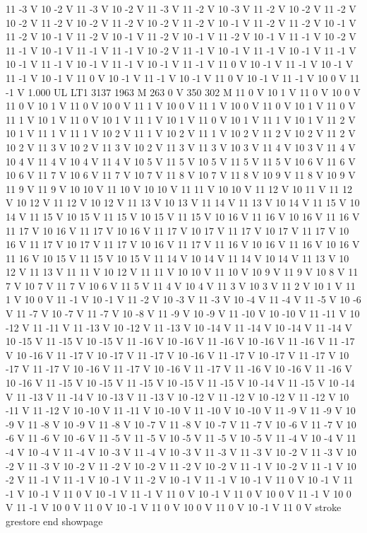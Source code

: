 {11 -3 V
10 -2 V
11 -3 V
10 -2 V
11 -3 V
11 -2 V
10 -3 V
11 -2 V
10 -2 V
11 -2 V
10 -2 V
11 -2 V
10 -2 V
11 -2 V
10 -2 V
11 -2 V
10 -1 V
11 -2 V
11 -2 V
10 -1 V
11 -2 V
10 -1 V
11 -2 V
10 -1 V
11 -2 V
10 -1 V
11 -2 V
10 -1 V
11 -1 V
10 -2 V
11 -1 V
10 -1 V
11 -1 V
11 -1 V
10 -2 V
11 -1 V
10 -1 V
11 -1 V
10 -1 V
11 -1 V
10 -1 V
11 -1 V
10 -1 V
11 -1 V
10 -1 V
11 -1 V
11 0 V
10 -1 V
11 -1 V
10 -1 V
11 -1 V
10 -1 V
11 0 V
10 -1 V
11 -1 V
10 -1 V
11 0 V
10 -1 V
11 -1 V
10 0 V
11 -1 V
1.000 UL
LT1
3137 1963 M
263 0 V
350 302 M
11 0 V
10 1 V
11 0 V
10 0 V
11 0 V
10 1 V
11 0 V
10 0 V
11 1 V
10 0 V
11 1 V
10 0 V
11 0 V
10 1 V
11 0 V
11 1 V
10 1 V
11 0 V
10 1 V
11 1 V
10 1 V
11 0 V
10 1 V
11 1 V
10 1 V
11 2 V
10 1 V
11 1 V
11 1 V
10 2 V
11 1 V
10 2 V
11 1 V
10 2 V
11 2 V
10 2 V
11 2 V
10 2 V
11 3 V
10 2 V
11 3 V
10 2 V
11 3 V
11 3 V
10 3 V
11 4 V
10 3 V
11 4 V
10 4 V
11 4 V
10 4 V
11 4 V
10 5 V
11 5 V
10 5 V
11 5 V
11 5 V
10 6 V
11 6 V
10 6 V
11 7 V
10 6 V
11 7 V
10 7 V
11 8 V
10 7 V
11 8 V
10 9 V
11 8 V
10 9 V
11 9 V
11 9 V
10 10 V
11 10 V
10 10 V
11 11 V
10 10 V
11 12 V
10 11 V
11 12 V
10 12 V
11 12 V
10 12 V
11 13 V
10 13 V
11 14 V
11 13 V
10 14 V
11 15 V
10 14 V
11 15 V
10 15 V
11 15 V
10 15 V
11 15 V
10 16 V
11 16 V
10 16 V
11 16 V
11 17 V
10 16 V
11 17 V
10 16 V
11 17 V
10 17 V
11 17 V
10 17 V
11 17 V
10 16 V
11 17 V
10 17 V
11 17 V
10 16 V
11 17 V
11 16 V
10 16 V
11 16 V
10 16 V
11 16 V
10 15 V
11 15 V
10 15 V
11 14 V
10 14 V
11 14 V
10 14 V
11 13 V
10 12 V
11 13 V
11 11 V
10 12 V
11 11 V
10 10 V
11 10 V
10 9 V
11 9 V
10 8 V
11 7 V
10 7 V
11 7 V
10 6 V
11 5 V
11 4 V
10 4 V
11 3 V
10 3 V
11 2 V
10 1 V
11 1 V
10 0 V
11 -1 V
10 -1 V
11 -2 V
10 -3 V
11 -3 V
10 -4 V
11 -4 V
11 -5 V
10 -6 V
11 -7 V
10 -7 V
11 -7 V
10 -8 V
11 -9 V
10 -9 V
11 -10 V
10 -10 V
11 -11 V
10 -12 V
11 -11 V
11 -13 V
10 -12 V
11 -13 V
10 -14 V
11 -14 V
10 -14 V
11 -14 V
10 -15 V
11 -15 V
10 -15 V
11 -16 V
10 -16 V
11 -16 V
10 -16 V
11 -16 V
11 -17 V
10 -16 V
11 -17 V
10 -17 V
11 -17 V
10 -16 V
11 -17 V
10 -17 V
11 -17 V
10 -17 V
11 -17 V
10 -16 V
11 -17 V
10 -16 V
11 -17 V
11 -16 V
10 -16 V
11 -16 V
10 -16 V
11 -15 V
10 -15 V
11 -15 V
10 -15 V
11 -15 V
10 -14 V
11 -15 V
10 -14 V
11 -13 V
11 -14 V
10 -13 V
11 -13 V
10 -12 V
11 -12 V
10 -12 V
11 -12 V
10 -11 V
11 -12 V
10 -10 V
11 -11 V
10 -10 V
11 -10 V
10 -10 V
11 -9 V
11 -9 V
10 -9 V
11 -8 V
10 -9 V
11 -8 V
10 -7 V
11 -8 V
10 -7 V
11 -7 V
10 -6 V
11 -7 V
10 -6 V
11 -6 V
10 -6 V
11 -5 V
11 -5 V
10 -5 V
11 -5 V
10 -5 V
11 -4 V
10 -4 V
11 -4 V
10 -4 V
11 -4 V
10 -3 V
11 -4 V
10 -3 V
11 -3 V
11 -3 V
10 -2 V
11 -3 V
10 -2 V
11 -3 V
10 -2 V
11 -2 V
10 -2 V
11 -2 V
10 -2 V
11 -1 V
10 -2 V
11 -1 V
10 -2 V
11 -1 V
11 -1 V
10 -1 V
11 -2 V
10 -1 V
11 -1 V
10 -1 V
11 0 V
10 -1 V
11 -1 V
10 -1 V
11 0 V
10 -1 V
11 -1 V
11 0 V
10 -1 V
11 0 V
10 0 V
11 -1 V
10 0 V
11 -1 V
10 0 V
11 0 V
10 -1 V
11 0 V
10 0 V
11 0 V
10 -1 V
11 0 V
stroke
grestore
end
showpage
}
